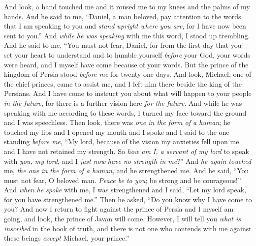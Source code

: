 \begin{biblechapter}
\verse And look, a hand touched me and it roused me to my knees and the palms of my hands.
\verse And he said to me, “Daniel, a man beloved, pay attention to the words that I am speaking to you and \textit{stand upright where you are}, for I have now been sent to you.” And \textit{while he was speaking} with me this word, I stood up trembling.
\verse And he said to me, “You must not fear, Daniel, for from the first day that you set your heart to understand and to humble yourself \textit{before} your God, your words were heard, and I myself have come because of your words.
\verse But the prince of the kingdom of Persia stood \textit{before me} for twenty-one days. And look, Michael, one of the chief princes, came to assist me, and I left him there beside the king of the Persians.
\verse And I have come to instruct you about what will happen to your people \textit{in the future}, for there is a further vision here \textit{for the future}.
\verse And while he was speaking with me according to these words, I turned my face toward the ground and I was speechless.
\verse Then look, there was \textit{one in the form of a human}; he touched my lips and I opened my mouth and I spoke and I said to the one standing \textit{before me}, “My lord, because of the vision my anxieties fell upon me and I have not retained my strength.
\verse So \textit{how am I, a servant of my lord} to speak with \textit{you, my lord}, and I \textit{just now} \textit{have no strength in me}?”
\verse And \textit{he again touched} me, \textit{the one in the form of a human}, and he strengthened me.
\verse And he said, “You must not fear, O beloved man. \textit{Peace be to you}; be strong and be courageous!” And \textit{when he spoke} with me, I was strengthened and I said, “Let my lord speak, for you have strengthened me.”
\verse Then he asked, “Do you know why I have come to you? And now I return to fight against the prince of Persia and I myself am going, and look, the prince of Javan will come.
\verse However, I will tell you \textit{what is inscribed} in the book of truth, and there is not one who contends with me against these beings \textit{except} Michael, your prince.”
\end{biblechapter}

